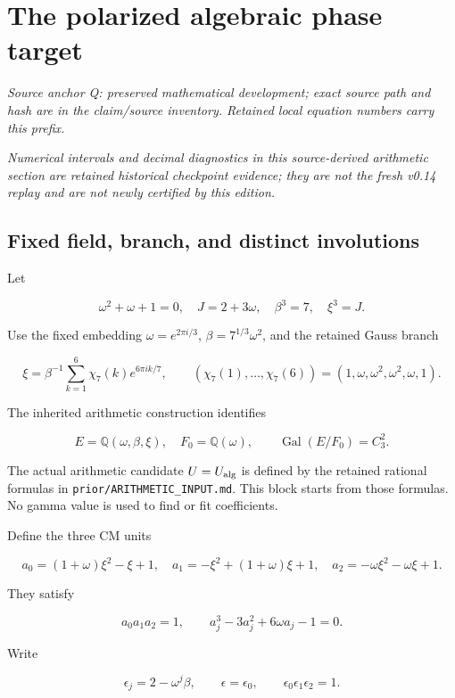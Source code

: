 \section{The polarized algebraic phase target}\label{sec:polarization}
\noindent\textit{Source anchor Q: preserved mathematical development; exact source path and hash are in the claim/source inventory. Retained local equation numbers carry this prefix.}\par
\noindent\textit{Numerical intervals and decimal diagnostics in this source-derived arithmetic section are retained historical checkpoint evidence; they are not the fresh v0.14 replay and are not newly certified by this edition.}\par
\hypertarget{Q-fixed-field-branch-and-distinct-involutions}{%
\subsection{Fixed field, branch, and distinct
involutions}\label{Q-fixed-field-branch-and-distinct-involutions}}

Let

\[
 \omega^2+\omega+1=0,\quad J=2+3\omega,\quad
 \beta^3=7,\quad \xi^3=J.
\]

Use the fixed embedding \(\omega=e^{2\pi i/3}\),
\(\beta=7^{1/3}\omega^2\), and the retained Gauss branch

\[
 \xi=\beta^{-1}\sum_{k=1}^6\chi_7(k)e^{6\pi i k/7},
 \qquad (\chi_7(1),\ldots,\chi_7(6))=(1,\omega,\omega^2,\omega^2,\omega,1).
\]

The inherited arithmetic construction identifies

\[
 E=\mathbb Q(\omega,\beta,\xi),\quad F_0=\mathbb Q(\omega),
 \qquad \operatorname{Gal}(E/F_0)=C_3^2.
\]

The actual arithmetic candidate \(U=U_{\rm alg}\) is defined by the
retained rational formulas in \nolinkurl{prior/ARITHMETIC_INPUT.md}. This
block starts from those formulas. No gamma value is used to find or fit
coefficients.

Define the three CM units

\[
 a_0=(1+\omega)\xi^2-\xi+1,\quad
 a_1=-\xi^2+(1+\omega)\xi+1,\quad
 a_2=-\omega\xi^2-\omega\xi+1.
\]

They satisfy

\[
 a_0a_1a_2=1,\qquad a_j^3-3a_j^2+6\omega a_j-1=0.
\]

Write

\[
 \epsilon_j=2-\omega^j\beta,\qquad \epsilon=\epsilon_0,
 \qquad \epsilon_0\epsilon_1\epsilon_2=1.
\]

